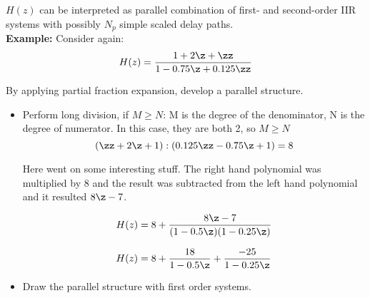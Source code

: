 $H(z)$ can be interpreted as parallel combination of first- and second-order IIR systems with possibly $N_p$ simple scaled delay paths. \\

\textbf{Example:} Consider again:
$$ H(z) = \frac{1+2\z + \zz}{1-0.75\z+0.125\zz}$$

By applying partial fraction expansion, develop a parallel structure.

\begin{itemize}
	\item Perform long division, if $M \geq N$:
	M is the degree of the denominator, N is the degree of numerator. In this case, they are both 2, so $M \geq N$
	$${(\zz+2\z+1)}:{(0.125\zz-0.75\z+1)} = 8$$

	Here went on some interesting stuff. The right hand polynomial was multiplied by 8 and the result was subtracted from the left hand polynomial and it resulted $8\z-7$.

	$$H(z) = 8+\frac{8\z-7}{(1-0.5\z)(1-0.25\z)}$$

	$$H(z) = 8 +\frac{18}{1-0.5\z} + \frac{-25}{1-0.25\z}$$

	\item Draw the parallel structure with first order systems.

\end{itemize}

